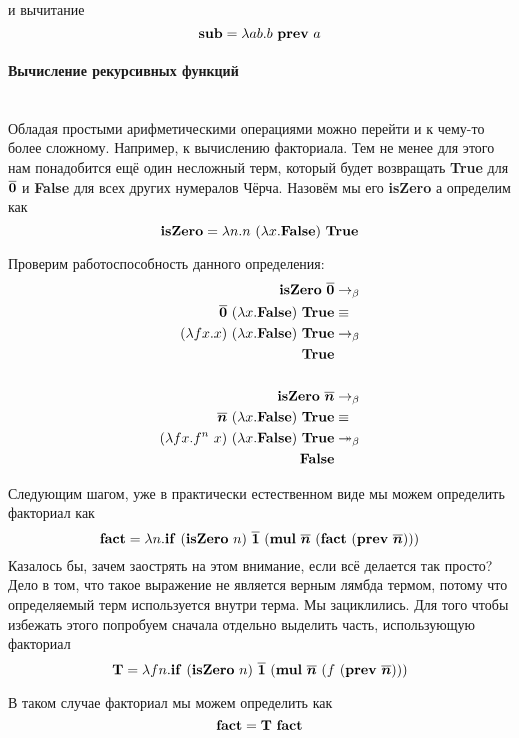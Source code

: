 \documentclass[lambda.tex]{subfiles}
\begin{document}
и вычитание
\[\mmterm{sub} = \lambda ab.b\ \mmterm{prev}\ a\]
\newpage
\paragraph{Вычисление рекурсивных функций} %
\label{par:factorial}~\\

Обладая простыми арифметическими операциями можно перейти и к чему-то более сложному.
Например, к вычислению факториала. Тем не менее для этого нам понадобится ещё один несложный терм, который будет возвращать \textbf{True} для $\boldsymbol{\overline{0}}$ и \textbf{False} для всех других нумералов Чёрча.
Назовём мы его \textbf{isZero} а определим как
\[\text{\textbf{isZero}} = \lambda n.n\ (\lambda x. \text{\textbf{False}})\ \text{\textbf{True}}\]

Проверим работоспособность данного определения:
\begin{align*}
	\text{\textbf{isZero}}\ \boldsymbol{\overline{0}} &\rightarrow_\beta\\
	\boldsymbol{\overline{0}}\ (\lambda x.\text{\textbf{False}})\ \text{\textbf{True}} &\equiv\\
	(\lambda fx.x)\ (\lambda x.\text{\textbf{False}})\ \text{\textbf{True}} &\rightarrow_\beta\\
	\text{\textbf{True}}&\\
	\\
	\text{\textbf{isZero}}\ \boldsymbol{\overline{n}} &\rightarrow_\beta\\
	\boldsymbol{\overline{n}}\ (\lambda x.\text{\textbf{False}})\ \text{\textbf{True}} &\equiv\\
	(\lambda fx.f^n\ x)\ (\lambda x.\text{\textbf{False}})\ \text{\textbf{True}} &\twoheadrightarrow_\beta\\
	\text{\textbf{False}}&\\
\end{align*}

Следующим шагом, уже в практически естественном виде мы можем определить факториал как
\[\mmterm{fact} = \lambda n. \mmif\ (\mmterm{isZero}\ n)\ \mmchurchn{1}\ (\mmterm{mul}\ \mmchurchn{n}\ (\mmterm{fact}\ (\mmterm{prev}\ \mmchurchn{n})))\]
Казалось бы, зачем заострять на этом внимание, если всё делается так просто?
Дело в том, что такое выражение не является верным лямбда термом, потому что определяемый терм используется внутри терма.
Мы зациклились.
Для того чтобы избежать этого попробуем сначала отдельно выделить часть, использующую факториал
\[\mmterm{T} = \lambda fn. \mmif\ (\mmterm{isZero}\ n)\ \mmchurchn{1}\ (\mmterm{mul}\ \mmchurchn{n}\ (f\ (\mmterm{prev}\ \mmchurchn{n})))\]

В таком случае факториал мы можем определить как
\[\mmterm{fact} = \mmterm{T}\ \mmterm{fact}\]
\end{document}
